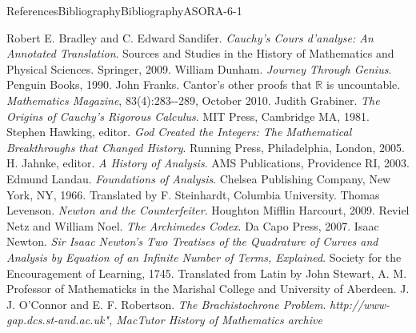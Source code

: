 \documentclass[oneside,10pt,]{book}
\numberwithin{equation}{part}
\newcommand{\RR}{\mathbb {R}}
\begin{document}
\begin{references-chapter-numberless}{References}{Bibliography}{}{Bibliography}{}{}{ASORA-6-1}
\begin{referencelist}
\hypertarget{bradley09__cauch_cours}{}Robert E. Bradley and C. Edward Sandifer. \emph{\textit{Cauchy's Cours d'analyse}: An Annotated Translation}. Sources and Studies in the History of Mathematics and Physical Sciences. Springer, 2009.
\hypertarget{dunham90__journ_throug_genius}{}William Dunham. \emph{Journey Through Genius}. Penguin Books, 1990.
\hypertarget{franks10__cantor_other_proof_rr_uncoun}{}John Franks. Cantor's other proofs that \(\RR\) is uncountable. \emph{Mathematics Magazine}, 83(4):283-{}-{}289, October 2010.
\hypertarget{grabiner81__origin_cauch_rigor_calculy}{}Judith Grabiner. \emph{The Origins of Cauchy's Rigorous Calculus}. MIT Press, Cambridge MA, 1981.
\hypertarget{hawking05__god_creat_integ}{}Stephen Hawking, editor. \emph{God Created the Integers: The Mathematical Breakthroughs that Changed History}. Running Press, Philadelphia, London, 2005.
\hypertarget{jahnke03__histor_analy}{}H. Jahnke, editor. \emph{A History of Analysis}. AMS Publications, Providence RI, 2003.
\hypertarget{landau66__found_analy}{}Edmund Landau. \emph{Foundations of Analysis}. Chelsea Publishing Company, New York, NY, 1966. Translated by F. Steinhardt, Columbia University.
\hypertarget{levenson09__newton_count}{}Thomas Levenson. \emph{Newton and the Counterfeiter}. Houghton Mifflin Harcourt, 2009.
\hypertarget{netz07__archim_codex}{}Reviel Netz and William Noel. \emph{The Archimedes Codex}. Da Capo Press, 2007.
\hypertarget{newton45__sir_isaac_two_treat_quadr}{}Isaac Newton. \emph{Sir Isaac Newton's Two Treatises of the Quadrature of Curves and Analysis by Equation of an Infinite Number of Terms, Explained}. Society for the Encouragement of Learning, 1745. Translated from Latin by John Stewart, A. M. Professor of Mathematicks in the Marishal College and University of Aberdeen.
\hypertarget{Bernoulli_bio_mactutor}{}J. J. O'Connor and E. F. Robertson. \emph{The Brachistochrone Problem}. \emph{http:\slash{}\slash{}www-gap.dcs.st-and.ac.uk", MacTutor History of Mathematics archive}

\end{referencelist}
\end{references-chapter-numberless}
\end{document}
